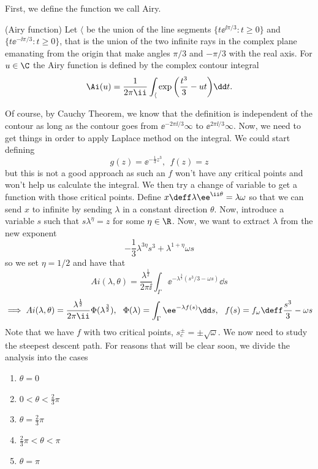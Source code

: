First, we define the function we call Airy. 

\begin{definition}
	(Airy function) Let $\langle$ be the union of the line segments $\{t\ee^{\ii \pi/3} : t \geq 0\}$ and $\{ t\ee^{-\ii\pi/3}: t \geq 0\}$, that is the union of the two infinite rays in the complex plane emanating from the origin that make	angles $\pi/3$ and $-\pi/3$ with the real axis. For $u \in \C$ the Airy function is defined by the
	complex contour integral
	\begin{equation}
		\Ai(u) = \frac{1}{2\pi\ii} \int_{\langle} \exp{\left(\frac{t^3}{3} - ut\right)} \dd t.
	\end{equation}
	\label{Def: Airy Function}
\end{definition}
Of course, by Cauchy Theorem, we know that the definition is independent of the contour as long as the contour goes from $\ee^{-2\pi\ii / 3}\infty$ to $\ee^{2\pi\ii / 3}\infty$. Now, we need to get things in order to apply Laplace method on the integral. We could start defining
$$g(z) = \ee^{-\frac{1}{3} z^3}, \ \ f(z) = z$$
but this is not a good approach as such an $f$ won't have any critical points and won't help us calculate the integral. We then try a change of variable to get a function with those critical points. Define $x \deff \lambda \ee^{\ii \theta} = \lambda \omega$ so that we can send $x$ to infinite by sending $\lambda$ in a constant direction $\theta$. Now, introduce a variable $s$ such that $s\lambda^{\eta} = z$ for some $\eta \in \R$. Now, we want to extract $\lambda$ from the new exponent 
$$-\frac{1}{3}\lambda^{3\eta}s^3 + \lambda^{1+\eta} \omega s$$
so we set $\eta = 1/2$ and have that
$$Ai(\lambda, \theta) = \frac{\lambda^{\frac{1}{2}}}{2\pi \ii} \int_{\Gamma} \ee^{-\lambda^{\frac{3}{2}}(s^3/3 - \omega s)} \dd s$$
$$\implies Ai(\lambda, \theta) = \frac{\lambda^{\frac{1}{2}}}{2\pi \ii}\Phi(\lambda^{\frac{3}{2}}) , \ \ \Phi(\lambda) = \int_{\Gamma} \ee^{-\lambda f(s)} \dd s, \ \ f(s) = f_{\omega} \deff \frac{s^3}{3} - \omega s $$ 
Note that we have $f$ with two critical points, $s_c^{\pm} = \pm \sqrt{\omega}$. We now need to study the steepest descent path. For reasons that will be clear soon, we divide the analysis into the cases
\begin{enumerate}
	\item $\theta = 0$
	\item $0< \theta < \frac{2}{3} \pi$	
	\item $\theta = \frac{2}{3} \pi$
	\item $\frac{2}{3} \pi < \theta < \pi$
	\item $\theta  = \pi$
\end{enumerate}
